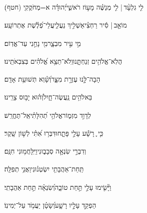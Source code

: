 \documentclass[12pt]{article}
\newcommand{\loc}[1]{\textsuperscript{\locf{#1}}}
\begin{document}
{\loc{ ט}~}‏לִ֤י גִלְעָ֨ד | {\hfill}לִ֤י מְנַשֶּׁ֗ה\newline\hspace*{.5em} מָע֣וֹז רֹאשִׁ֑י{\hfill}יְ֝הוּדָ֗ה א=מְחֹקֲקִֽי (חטף)׃\par

{\loc{ י}~}‏מוֹאָ֤ב |  סִ֬יר רַחְצִ֗י{\hfill}\newline\hspace*{.5em}אַשְׁלִ֣יךְ נַעֲלִ֑י{\hfill}עֲלֵי־פְ֝לֶ֗שֶׁת אֶתְרוֹעָֽע׃\par

{\loc{ יא}~}‏מִ֣י  עִ֣יר מִבְצָ֑ר{\hfill}מִ֖י נָחַ֣נִי עַד־אֱדֽוֹם׃\par

{\loc{ יב}~}‏הֲלֹֽא־אֱלֹהִ֥ים זְנַחְתָּ֑נוּ{\hfill}וְֽלֹא־תֵצֵ֥א אֱ֝לֹהִ֗ים בְּצִבְאֹתֵֽינוּ׃\par

{\loc{ יג}~}‏הָבָה־לָּ֣נוּ עֶזְרָ֣ת מִצָּ֑ר{\hfill}וְ֝שָׁ֗וְא תְּשׁוּעַ֥ת אָדָֽם׃\par

{\loc{ יד}~}‏בֵּאלֹהִ֥ים נַֽעֲשֶׂה־חָ֑יִל{\hfill}וְ֝ה֗וּא יָב֥וּס צָרֵֽינוּ׃\par\pend
\ledpb
\pstart[\subsection*{\textcolor{red}{פרק קט}}]\label{פרק קט}
{\loc{ א}~}‏ לְדָוִ֣ד מִזְמ֑וֹר\newline\hspace*{.5em}אֱלֹהֵ֥י תְ֝הִלָּתִ֗י{\hfill}אַֽל־תֶּחֱרַֽשׁ׃\par

{\loc{ ב}~}‏כִּ֤י ֪ רָשָׁ֡ע {\hfill}עָלַ֣י פָּתָ֑חוּ\newline\hspace*{.5em}דִּבְּר֥וּ אִ֝תִּ֗י לְשׁ֣וֹן שָֽׁקֶר׃\par

{\loc{ ג}~}‏וְדִבְרֵ֣י שִׂנְאָ֣ה סְבָב֑וּנִי{\hfill}וַיִּֽלָּחֲמ֥וּנִי חִנָּֽם׃\par

{\loc{ ד}~}‏תַּֽחַת־אַהֲבָתִ֥י יִשְׂטְנ֗וּנִי{\hfill}וַאֲנִ֥י תְפִלָּֽה׃\par

{\loc{ ה}~}‏וַיָּ֘שִׂ֤ימוּ עָלַ֣י  תַּ֣חַת טוֹבָ֑ה{\hfill}וְ֝שִׂנְאָ֗ה תַּ֣חַת אַהֲבָתִֽי׃\par

{\loc{ ו}~}‏הַפְקֵ֣ד עָלָ֣יו רָשָׁ֑ע{\hfill}וְ֝שָׂטָ֗ן יַעֲמֹ֥ד עַל־יְמִינֽוֹ׃\par
\end{document}
